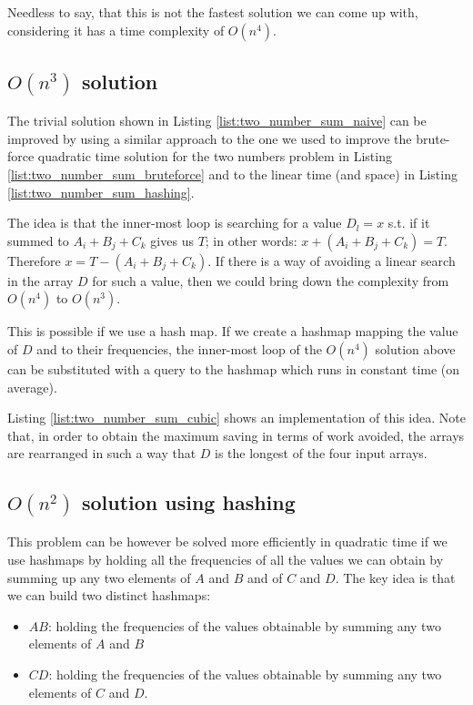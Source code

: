 

Needless to say, that this is not the fastest solution we can come up with, considering it has a time complexity of $O(n^4)$.

\subsection{$O(n^3)$ solution}
The trivial solution shown in Listing \ref{list:two_number_sum_naive} can be improved by using a similar approach to the one we used to improve the brute-force 
quadratic time solution for the two numbers problem in Listing \ref{list:two_number_sum_bruteforce} and to the linear time (and space) in Listing \ref{list:two_number_sum_hashing}.

The idea is that the inner-most loop is searching for a value $D_l = x$  s.t. if it summed to $A_i+B_j+C_k$ gives us $T$; in other words: $x+(A_i+B_j+C_k)=T$.
Therefore $x = T-(A_i+B_j+C_k)$. If there is a way of avoiding a linear search in the array $D$ for such a value, then we could bring down the complexity from $O(n^4)$ to $O(n^3)$.

This is possible if we use a hash map. If we create a hashmap mapping the value of $D$ and to their frequencies, the inner-most loop of the $O(n^4)$ solution above can be substituted with a query to the hashmap which runs in constant time (on average). 

Listing \ref{list:two_number_sum_cubic} shows an implementation of this idea. 
Note that, in order to obtain the maximum saving in terms of work avoided, the arrays are rearranged in such a way that $D$ is the longest of the four input arrays. 




\subsection{$O(n^2)$ solution using hashing}

This problem can be however be solved  more efficiently in quadratic time if we use hashmaps by holding all  
the frequencies of all the values we can obtain by summing up any two elements of $A$ and $B$ and of $C$ and $D$.
The key idea is that we can build two distinct hashmaps:
\begin{itemize}
	\item $AB$: holding the frequencies of the values obtainable by summing any two elements of $A$ and $B$
	\item $CD$: holding the frequencies of the values obtainable by summing any two elements of $C$ and $D$.
\end{itemize}

